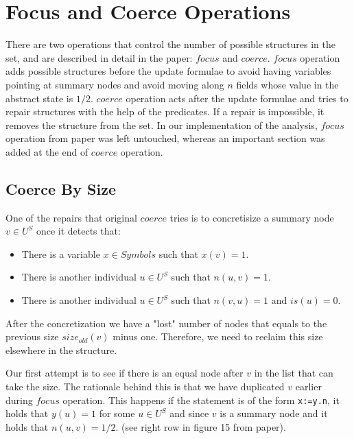 \section*{Focus and Coerce Operations}
There are two operations that control the number of possible structures in the set, and are described in detail in the paper: $focus$ and $coerce$. $focus$ operation adds possible structures before the update formulae to avoid having variables pointing at summary nodes and avoid moving along $n$ fields whose value in the abstract state is $1/2$. $coerce$ operation acts after the update formulae and tries to repair structures with the help of the predicates. If a repair is impossible, it removes the structure from the set. In our implementation of the analysis, $focus$ operation from paper was left untouched, whereas an important section was added at the end of $coerce$ operation.
\subsection*{Coerce By Size}
One of the repairs that original $coerce$ tries is to concretisize a summary node $v\in U^S$ once it detects that:
\begin{itemize}
	\item There is a variable $x\in Symbols$ such that $x(v)=1$.
	\item There is another individual $u\in U^S$ such that $n(u,v)=1$.
	\item There is another individual $u\in U^S$ such that $n(v,u)=1$ and $is(u)=0$.
\end{itemize}
After the concretization we have a "lost" number of nodes that equals to the previous size $size_{old}(v)$ minus one. Therefore, we need to reclaim this size elsewhere in the structure. 

Our first attempt is to see if there is an equal node after $v$ in the list that can take the size. The rationale behind this is that we have duplicated $v$ earlier during $focus$ operation. This happens if the statement is of the form \texttt{x:=y.n}, it holds that $y(u)=1$ for some $u\in U^S$ and since $v$ is a summary node and it holds that $n(u,v)=1/2$. (see right row in figure 15 from paper).

